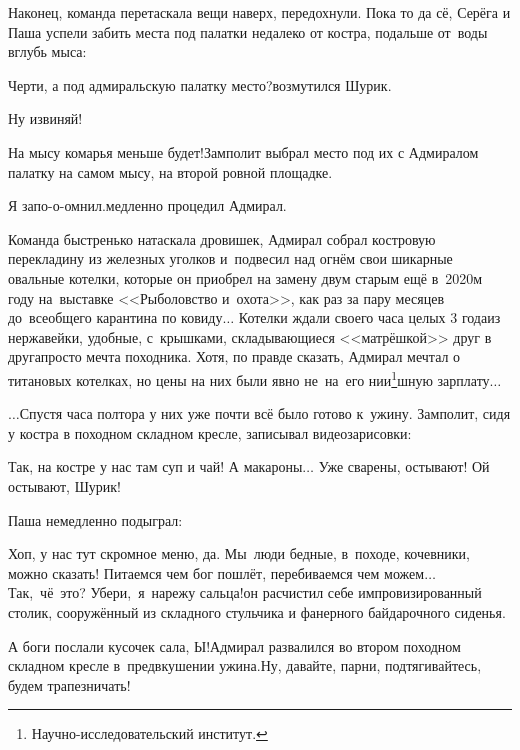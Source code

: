 Наконец, команда перетаскала вещи наверх, передохнули. Пока то да сё, Серёга и Паша успели забить места под палатки недалеко от костра, подальше от~воды вглубь мыса:

\diagdash Черти, а под адмиральскую палатку место?\mdash возмутился Шурик.

\diagdash Ну извиняй!

\diagdash На мысу комарья меньше будет!\mdash Замполит выбрал место под их с Адмиралом палатку на самом мысу, на второй ровной площадке.

\diagdash Я запо-о-омнил.\mdash медленно процедил Адмирал.

\renewcommand*{\thefootnote}{\fnsymbol{footnote}}
\setcounter{footnote}{0}
Команда быстренько натаскала дровишек, Адмирал собрал костровую перекладину из железных уголков и~подвесил над огнём свои шикарные овальные котелки, которые он приобрел на замену двум старым ещё в~2020\sdash м году на~выставке <<Рыболовство и~охота>>, как раз за пару месяцев до~всеобщего карантина по ковиду$\ldots$ Котелки ждали своего часа целых 3 года\mdash из нержавейки, удобные, с~крышками, складывающиеся <<матрёшкой>> друг в друга\mdash просто мечта походника. Хотя, по правде сказать, Адмирал мечтал о титановых котелках, но цены на них были явно не~на~его нии\footnote{Научно-исследовательский институт.}\sdash шную зарплату$\ldots$

\vspace{0.5cm}
$\ldots$Спустя часа полтора у них уже почти всё было готово к~ужину. %
Замполит, сидя у костра в походном складном кресле, записывал видеозарисовки:

\diagdash Так, на костре у нас там суп и чай! А макароны$\ldots$ Уже сварены, остывают! Ой остывают, Шурик!

Паша немедленно подыграл:

\diagdash Хоп, у нас тут скромное меню, да. Мы~люди бедные, в~походе, кочевники, можно сказать! Питаемся чем бог пошлёт, перебиваемся чем можем$\ldots$ Так,~чё~это? Убери,~я~нарежу сальца!\mdash он расчистил себе импровизированный столик, сооружённый из складного стульчика и фанерного байдарочного сиденья.

\diagdash А боги послали кусочек сала, Ы!\mdash Адмирал развалился во втором походном складном кресле в~предвкушении ужина.\mdash Ну, давайте, парни, подтягивайтесь, будем трапезничать!

